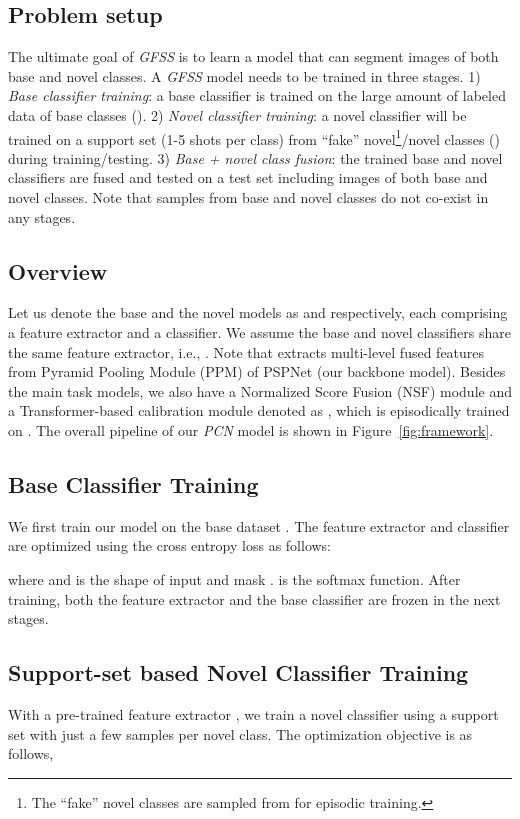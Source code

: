 \documentclass[journal]{IEEEtran}
\begin{document}
\subsection{Problem setup} The ultimate goal of \textit{GFSS} is to learn a model that can segment images of both base and novel classes. 
A \textit{GFSS} model needs to be trained in three stages. 1) \emph{Base classifier training}: a base classifier is trained on the large amount of labeled data  of  base classes ().
2) \emph{Novel classifier training}: a novel classifier will be trained on a support set (1-5 shots per class) from ``fake'' novel\footnote{The ``fake'' novel classes are sampled from  for episodic training.}/novel classes () during training/testing.
3) \emph{Base + novel class fusion}: the trained base and novel classifiers are fused and  tested on a test set  including images of both base and novel classes.
Note that samples from base and novel classes do not co-exist in any stages.

\subsection{Overview} Let us denote the base and the novel models as  and  respectively, each comprising a feature extractor and a classifier. We assume the base and novel classifiers share the same feature extractor, i.e., .
Note that  extracts multi-level fused features from Pyramid Pooling Module (PPM) of PSPNet \cite{zhao2017pyramid} (our backbone model).
Besides the main task models, we also have a  Normalized Score Fusion (NSF) module and a Transformer-based calibration module denoted as , which is episodically trained on . 
The overall pipeline of our \textit{PCN} model is shown in Figure~\ref{fig:framework}.

\subsection{Base Classifier Training}
We first train our model  on the base dataset . The feature extractor  and classifier  are optimized using the cross entropy loss as follows:

where  and  is the shape of input  and mask .  is the softmax function. After training, both the feature extractor and the base classifier are frozen in the next stages.

\subsection{Support-set based Novel Classifier Training}
With a pre-trained feature extractor , we train a novel classifier  using a support set  with just a few samples per novel class. The optimization objective is as follows,
\end{document}

